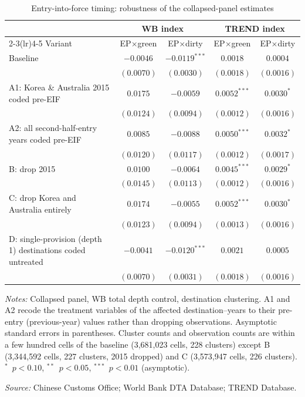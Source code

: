 \begin{table}[htbp]
\centering
\footnotesize
\caption{Entry-into-force timing: robustness of the collapsed-panel estimates}
\label{tab:eif}
\begin{threeparttable}
\begin{tabular}{lcccc}
\toprule
 & \multicolumn{2}{c}{WB index} & \multicolumn{2}{c}{TREND index} \\
\cmidrule(lr){2-3}\cmidrule(lr){4-5}
Variant & EP$\times$green & EP$\times$dirty & EP$\times$green & EP$\times$dirty \\
\midrule
Baseline & $-0.0046$ & $-0.0119^{***}$ & $0.0018$ & $0.0004$ \\
         & $(0.0070)$ & $(0.0030)$ & $(0.0018)$ & $(0.0016)$ \\[4pt]
A1: Korea \& Australia 2015 coded pre-EIF & $0.0175$ & $-0.0059$ & $0.0052^{***}$ & $0.0030^{*}$ \\
         & $(0.0124)$ & $(0.0094)$ & $(0.0012)$ & $(0.0016)$ \\[4pt]
A2: all second-half-entry years coded pre-EIF & $0.0085$ & $-0.0088$ & $0.0050^{***}$ & $0.0032^{*}$ \\
         & $(0.0120)$ & $(0.0117)$ & $(0.0012)$ & $(0.0017)$ \\[4pt]
B: drop 2015 & $0.0100$ & $-0.0064$ & $0.0045^{***}$ & $0.0029^{*}$ \\
         & $(0.0145)$ & $(0.0113)$ & $(0.0012)$ & $(0.0016)$ \\[4pt]
C: drop Korea and Australia entirely & $0.0174$ & $-0.0055$ & $0.0052^{***}$ & $0.0030^{*}$ \\
         & $(0.0123)$ & $(0.0094)$ & $(0.0013)$ & $(0.0016)$ \\[4pt]
D: single-provision (depth 1) destinations coded untreated & $-0.0041$ & $-0.0120^{***}$ & $0.0021$ & $0.0005$ \\
         & $(0.0070)$ & $(0.0031)$ & $(0.0018)$ & $(0.0016)$ \\
\bottomrule
\end{tabular}
\begin{tablenotes}[flushleft]\footnotesize
\item \emph{Notes:} Collapsed panel, WB total depth control, destination clustering. A1 and A2 recode the treatment variables of the affected destination--years to their pre-entry (previous-year) values rather than dropping observations. Asymptotic standard errors in parentheses. Cluster counts and observation counts are within a few hundred cells of the baseline (3{,}681{,}023 cells, 228 clusters) except B (3{,}344{,}592 cells, 227 clusters, 2015 dropped) and C (3{,}573{,}947 cells, 226 clusters). $^{*}$~$p<0.10$, $^{**}$~$p<0.05$, $^{***}$~$p<0.01$ (asymptotic).
\item \textit{Source:} Chinese Customs Office; World Bank DTA Database; TREND Database.
\end{tablenotes}
\end{threeparttable}
\end{table}
